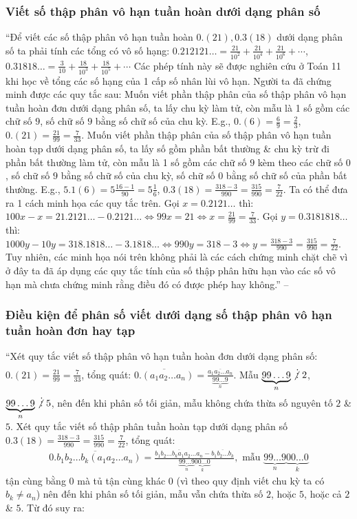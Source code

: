 \documentclass{article}
\numberwithin{equation}{section}
\begin{document}
\subsubsection{Viết số thập phân vô hạn tuần hoàn dưới dạng phân số}
``Để viết các số thập phân vô hạn tuần hoàn $0.(21),0.3(18)$ dưới dạng phân số ta phải tính các tổng có vô số hạng: $0.212121\ldots = \frac{21}{10^2} + \frac{21}{10^4} + \frac{21}{10^6} + \cdots$, $0.31818\ldots = \frac{3}{10} + \frac{18}{10^3} + \frac{18}{10^5} + \cdots$ Các phép tính này sẽ được nghiên cứu ở Toán 11 khi học về tổng các số hạng của 1 cấp số nhân lùi vô hạn. Người ta đã chứng minh được các quy tắc sau: Muốn viết phần thập phân của số thập phân vô hạn tuần hoàn đơn dưới dạng phân số, ta lấy chu kỳ làm tử, còn mẫu là 1 số gồm các chữ số $9$, số chữ số $9$ bằng số chữ số của chu kỳ. E.g., $0.(6) = \frac{6}{9} = \frac{2}{3}$, $0.(21) = \frac{21}{99} = \frac{7}{33}$. Muốn viết phần thập phân của số thập phân vô hạn tuần hoàn tạp dưới dạng phân số, ta lấy số gồm phần bất thường \& chu kỳ trừ đi phần bất thường làm tử, còn mẫu là 1 số gồm các chữ số $9$ kèm theo các chữ số $0$, số chữ số $9$ bằng số chữ số của chu kỳ, số chữ số $0$ bằng số chữ số của phần bất thường. E.g., $5.1(6) = 5\frac{16 - 1}{90} = 5\frac{1}{6}$, $0.3(18) = \frac{318 - 3}{990} = \frac{315}{990} = \frac{7}{22}$. Ta có thể đưa ra 1 cách minh họa các quy tắc trên. Gọi $x = 0.2121\ldots$ thì: $100x - x = 21.2121\ldots - 0.2121\ldots\Leftrightarrow 99 x = 21\Leftrightarrow x = \frac{21}{99} = \frac{7}{33}$. Gọi $y = 0.3181818\ldots$ thì: $1000y - 10y = 318.1818\ldots - 3.1818\ldots\Leftrightarrow 990y = 318 - 3\Leftrightarrow y = \frac{318 - 3}{990} = \frac{315}{990} = \frac{7}{22}$. Tuy nhiên, các minh họa nói trên không phải là các cách chứng minh chặt chẽ vì ở đây ta đã áp dụng các quy tắc tính của số thập phân hữu hạn vào các số vô hạn mà chưa chứng minh rằng điều đó có được phép hay không.'' -- \cite{Binh_Toan_7_tap_1}

\subsubsection{Điều kiện để phân số viết dưới dạng số thập phân vô hạn tuần hoàn đơn hay tạp}
``Xét quy tắc viết số thập phân vô hạn tuần hoàn đơn dưới dạng phân số: $0.(21) = \frac{21}{99} = \frac{7}{33}$, tổng quát: $\overline{0.(a_1a_2\ldots a_n)} = \frac{\overline{a_1a_2\ldots a_n}}{\underbrace{99\ldots 9}_n}$. Mẫu $\underbrace{99\ldots 9}_n\not\vdots\ 2$, $\underbrace{99\ldots 9}_n\not\vdots\ 5$, nên đến khi phân số tối giản, mẫu không chứa thừa số nguyên tố $2$ \& $5$. Xét quy tắc viết số thập phân tuần hoàn tạp dưới dạng phân số $0.3(18) = \frac{318 - 3}{990} = \frac{315}{990} = \frac{7}{22}$, tổng quát:
\begin{align*}
	\overline{0.b_1b_2\ldots b_k(a_1a_2\ldots a_n)} = \frac{\overline{b_1b_2\ldots b_ka_1a_2\ldots a_n} - \overline{b_1b_2\ldots b_k}}{\underbrace{99\ldots 9}_n\underbrace{00\ldots 0}_k}, \mbox{ mẫu } \underbrace{99\ldots 9}_n\underbrace{00\ldots 0}_k
\end{align*}
tận cùng bằng $0$ mà tủ tận cùng khác $0$ (vì theo quy định viết chu kỳ ta có $b_k\ne a_n$) nên đến khi phân số tối giản, mẫu vẫn chứa thừa số $2$, hoặc $5$, hoặc cả $2$ \& $5$. Từ đó suy ra:
\end{document}
